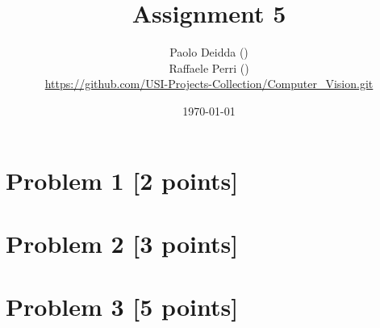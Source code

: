 \documentclass[12pt]{article}
\author{
	Paolo Deidda (\text{paolo.deidda@usi.ch}) \\ 
    Raffaele Perri (\text{raffaele.perri@usi.ch}) \\
    \url{https://github.com/USI-Projects-Collection/Computer_Vision.git}
}
\date{\today}
\begin{document}
\title{Assignment 5}
\maketitle

\section*{Problem 1 [2 points]}


\section*{Problem 2 [3 points]}


\section*{Problem 3 [5 points]}

\end{document}
